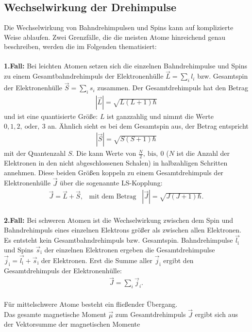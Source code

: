 \subsection{Wechselwirkung der Drehimpulse}
Die Wechselwirkung von Bahndrehimpulsen und Spins kann auf komplizierte Weise ablaufen.
Zwei Grenzfälle, die die meisten Atome hinreichend genau beschreiben, werden
die im Folgenden thematisiert:\\
\\
\textbf{1.Fall:} Bei leichten Atomen setzen sich die einzelnen Bahndrehimpulse und Spins
zu einem Gesamtbahndrehimpuls der Elektronenhülle $\vec{L}=\sum_i l_i$
bzw. Gesamtspin der Elektronenhülle $\vec{S}=\sum_i s_i$ zusammen.
Der Gesamtdrehimpuls hat den Betrag
\begin{align}
 |\vec{L}|=\sqrt{L(L+1)\hbar}
\end{align}
und ist eine quantisierte Größe:
$L$ ist ganzzahlig und nimmt die Werte $0,1,2 ,\ \text{oder} ,\ 3$ an.
Ähnlich sieht es bei dem Gesamtspin aus, der Betrag entspricht
\begin{align}
 |\vec{S}|=\sqrt{S(S+1)\hbar}
\end{align}
mit der Quantenzahl $S$. Die kann Werte von $\frac{N}{2} ,\ \text{bis} ,\ 0$
($N$ ist die Anzahl der Elektronen in den nicht abgeschlossenen Schalen)
in halbzahligen Schritten annehmen.
Diese beiden Größen koppeln zu einem Gesamtdrehimpuls der Elektronenhülle $\vec{J}$ über die sogenannte LS-Kopplung:
\begin{align}
  \vec{J}=\vec{L}+\vec{S} ,\,\,\,\,\, \text{mit dem Betrag}\,\,\,\,\,|\vec{J}|=\sqrt{J(J+1)\hbar}.
\end{align}\\
\textbf{2.Fall:} Bei schweren Atomen ist die Wechselwirkung zwischen dem Spin und
Bahndrehimpuls eines einzelnen Elektrons größer als zwischen allen Elektronen.
Es entsteht kein Gesamtbahndrehimpuls bzw. Gesamtspin.
Bahndrehimpulse $\vec{\textit{l}_\mathrm{i}}$ und Spins $\vec{s}_\mathrm{i}$ der einzelnen Elektronen ergeben
die Gesamtdrehimpulse $\vec{j}_\mathrm{i}=\vec{\textit{l}_\mathrm{i}}+\vec{s}_\mathrm{i}$ der Elektronen.
Erst die Summe aller $\vec{j}_\mathrm{i}$ ergibt den Gesamtdrehimpuls der Elektronenhülle:
\begin{align}
\vec{J}=\sum_i \vec{j}_i.
\end{align}\\
Für mittelschwere Atome besteht ein fließender Übergang.
\\
Das gesamte magnetische Moment $\vec{\mu}$ zum Gesamtdrehimpuls $\vec{J}$ ergibt sich aus der Vektorsumme der magnetischen Momente
